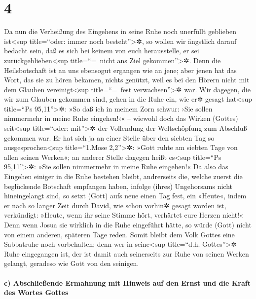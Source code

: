 \hypertarget{section-3}{%
\section{4}\label{section-3}}

 Da nun die Verheißung des Eingehens in seine Ruhe noch
unerfüllt geblieben ist\textless sup title=``oder: immer noch
besteht''\textgreater✲, so wollen wir ängstlich darauf bedacht sein, daß
es sich bei keinem von euch herausstelle, er sei
zurückgeblieben\textless sup title=``=~nicht ans Ziel
gekommen''\textgreater✲.  Denn die Heilsbotschaft ist an
uns ebensogut ergangen wie an jene; aber jenen hat das Wort, das sie zu
hören bekamen, nichts genützt, weil es bei den Hörern nicht mit dem
Glauben vereinigt\textless sup title=``=~fest verwachsen''\textgreater✲
war.  Wir dagegen, die wir zum Glauben gekommen sind,
gehen in die Ruhe ein, wie er✲ gesagt hat\textless sup title=``Ps
95,11''\textgreater✲: »So daß ich in meinem Zorn schwur: ›Sie sollen
nimmermehr in meine Ruhe eingehen!‹« -- wiewohl doch das Wirken (Gottes)
seit\textless sup title=``oder: mit''\textgreater✲ der Vollendung der
Weltschöpfung zum Abschluß gekommen war.  Er hat sich ja
an einer Stelle über den siebten Tag so ausgesprochen\textless sup
title=``1.Mose 2,2''\textgreater✲: »Gott ruhte am siebten Tage von allen
seinen Werken«;  an anderer Stelle dagegen heißt
es\textless sup title=``Ps 95,11''\textgreater✲: »Sie sollen nimmermehr
in meine Ruhe eingehen!«  Da also das Eingehen einiger in
die Ruhe bestehen bleibt, andrerseits die, welche zuerst die beglückende
Botschaft empfangen haben, infolge (ihres) Ungehorsams nicht
hineingelangt sind,  so setzt (Gott) aufs neue einen Tag
fest, ein »Heute«, indem er nach so langer Zeit durch David, wie schon
vorhin✲ gesagt worden ist, verkündigt: »Heute, wenn ihr seine Stimme
hört, verhärtet eure Herzen nicht!«  Denn wenn Josua sie
wirklich in die Ruhe eingeführt hätte, so würde (Gott) nicht von einem
anderen, späteren Tage reden.  Somit bleibt dem Volk
Gottes eine Sabbatruhe noch vorbehalten;  denn wer in
seine\textless sup title=``d.h. Gottes''\textgreater✲ Ruhe eingegangen
ist, der ist damit auch seinerseits zur Ruhe von seinen Werken gelangt,
geradeso wie Gott von den seinigen.

\hypertarget{c-abschlieuxdfende-ermahnung-mit-hinweis-auf-den-ernst-und-die-kraft-des-wortes-gottes}{%
\paragraph{c) Abschließende Ermahnung mit Hinweis auf den Ernst und die
Kraft des Wortes
Gottes}\label{c-abschlieuxdfende-ermahnung-mit-hinweis-auf-den-ernst-und-die-kraft-des-wortes-gottes}}

